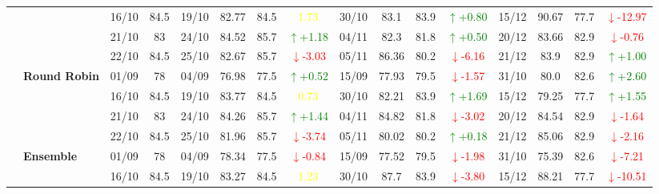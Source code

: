 \documentclass{ieeeaccess}
\begin{document}
{\begin{longtable}{llcc|cccc|cccc|cccc}
&
& 16/10 & 84.5 & 19/10 & 82.77 & 84.5 & \textcolor{yellow}{1.73} & 30/10 & 83.1 & 83.9 & \textcolor{green}{\(\uparrow\)+0.80} & 15/12 & 90.67 & 77.7 & \textcolor{red}{\(\downarrow\)-12.97} \\

&
& 21/10 & 83 & 24/10 & 84.52 & 85.7 & \textcolor{green}{\(\uparrow\)+1.18} & 04/11 & 82.3 & 81.8 & \textcolor{green}{\(\uparrow\)+0.50} & 20/12 & 83.66 & 82.9 & \textcolor{red}{\(\downarrow\)-0.76} \\

&
& 22/10 & 84.5 & 25/10 & 82.67 & 85.7 & \textcolor{red}{\(\downarrow\)-3.03} & 05/11 & 86.36 & 80.2 & \textcolor{red}{\(\downarrow\)-6.16} & 21/12 & 83.9 & 82.9 & \textcolor{green}{\(\uparrow\)+1.00} \\
\cmidrule(lr){2-16}


& \textbf{Round Robin}
& 01/09 & 78 & 04/09 & 76.98 & 77.5 & \textcolor{green}{\(\uparrow\)+0.52} & 15/09 & 77.93 & 79.5 & \textcolor{red}{\(\downarrow\)-1.57} & 31/10 & 80.0 & 82.6 & \textcolor{green}{\(\uparrow\)+2.60} \\

&
& 16/10 & 84.5 & 19/10 & 83.77 & 84.5 & \textcolor{yellow}{0.73} & 30/10 & 82.21 & 83.9 & \textcolor{green}{\(\uparrow\)+1.69} & 15/12 & 79.25 & 77.7 & \textcolor{green}{\(\uparrow\)+1.55} \\

&
& 21/10 & 83 & 24/10 & 84.26 & 85.7 & \textcolor{green}{\(\uparrow\)+1.44} & 04/11 & 84.82 & 81.8 & \textcolor{red}{\(\downarrow\)-3.02} & 20/12 & 84.54 & 82.9 & \textcolor{red}{\(\downarrow\)-1.64} \\

&
& 22/10 & 84.5 & 25/10 & 81.96 & 85.7 & \textcolor{red}{\(\downarrow\)-3.74} & 05/11 & 80.02 & 80.2 & \textcolor{green}{\(\uparrow\)+0.18} & 21/12 & 85.06 & 82.9 & \textcolor{red}{\(\downarrow\)-2.16} \\
\cmidrule(lr){2-16}




& \textbf{Ensemble}
& 01/09 & 78 & 04/09 & 78.34 & 77.5 & \textcolor{red}{\(\downarrow\)-0.84} & 15/09 & 77.52 & 79.5 & \textcolor{red}{\(\downarrow\)-1.98} & 31/10 & 75.39 & 82.6 & \textcolor{red}{\(\downarrow\)-7.21} \\

&
& 16/10 & 84.5 & 19/10 & 83.27 & 84.5 & \textcolor{yellow}{1.23} & 30/10 & 87.7 & 83.9 & \textcolor{red}{\(\downarrow\)-3.80} & 15/12 & 88.21 & 77.7 & \textcolor{red}{\(\downarrow\)-10.51} \\


\end{longtable}}
\end{document}
